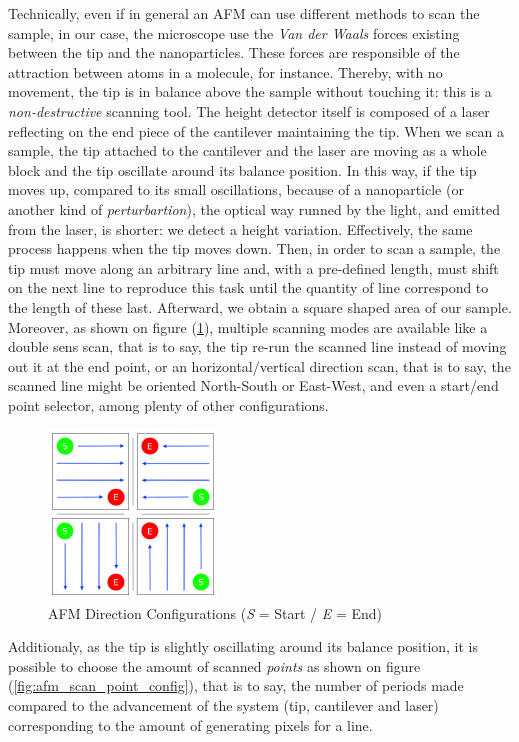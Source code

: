 \documentclass{article}
\numberwithin{equation}{section}
\begin{document}
Technically, even if in general an AFM can use different methods to scan the sample, in our case, the microscope use the \textit{Van der Waals} forces existing between the tip and the nanoparticles. These forces are responsible of the attraction between atoms in a molecule, for instance. Thereby, with no movement, the tip is in balance above the sample without touching it: this is a \textit{non-destructive} scanning tool. The height detector itself is composed of a laser reflecting on the end piece of the cantilever maintaining the tip. When we scan a sample, the tip attached to the cantilever and the laser are moving as a whole block and the tip oscillate around its balance position. In this way, if the tip moves up, compared to its small oscillations, because of a nanoparticle (or another kind of \textit{perturbartion}), the optical way runned by the light, and emitted from the laser, is shorter: we detect a height variation. Effectively, the same process happens when the tip moves down. Then, in order to scan a sample, the tip must move along an arbitrary line and, with a pre-defined length, must shift on the next line to reproduce this task until the quantity of line correspond to the length of these last. Afterward, we obtain a square shaped area of our sample. Moreover, as shown on figure (\ref{fig:afm_scan_dir_config}), multiple scanning modes are available like a double sens scan, that is to say, the tip re-run the scanned line instead of moving out it at the end point, or an horizontal/vertical direction scan, that is to say, the scanned line might be oriented North-South or East-West, and even a start/end point selector, among plenty of other configurations.
\begin{figure}[h]
    \centering
    \includegraphics[width=0.4\textwidth, height=0.40\textwidth]{afm_scan_dir_config.png}
    \caption{AFM Direction Configurations (\textit{S} = Start / \textit{E} = End)}
    \label{fig:afm_scan_dir_config}
\end{figure}
Additionaly, as the tip is slightly oscillating around its balance position, it is possible to choose the amount of scanned \textit{points} as shown on figure (\ref{fig:afm_scan_point_config}), that is to say, the number of periods made compared to the advancement of the system (tip, cantilever and laser) corresponding to the amount of generating pixels for a line. 
\end{document}
